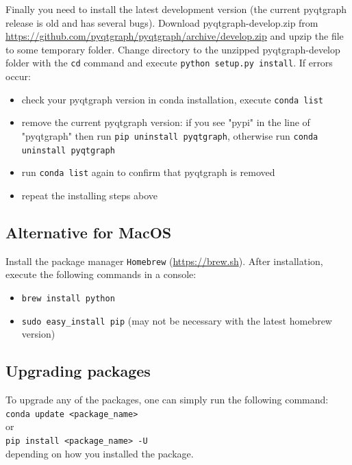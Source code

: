 \documentclass[oldfontcommands,openany,oneside]{memoir}
\begin{document}
Finally you need to install the latest development version (the current pyqtgraph release is old and has several bugs). Download pyqtgraph-develop.zip from \href{https://github.com/pyqtgraph/pyqtgraph/archive/develop.zip}{https://github.com/pyqtgraph/pyqtgraph/archive/develop.zip} and  upzip the file to some temporary folder. Change directory to the unzipped pyqtgraph-develop folder with the \texttt{cd} command and execute \texttt{python setup.py install}. If errors occur:
\begin{itemize}
\item check your pyqtgraph version in conda installation, execute \texttt{conda list}
\item remove the current pyqtgraph version: if you see "pypi" in the line of "pyqtgraph" then run \texttt{pip uninstall pyqtgraph}, otherwise run \texttt{conda uninstall pyqtgraph}
\item run \texttt{conda list} again to confirm that pyqtgraph is removed
\item repeat the installing steps above
\end{itemize}


\subsection{Alternative for MacOS}
Install the package manager \texttt{Homebrew} (\href{https://brew.sh}{https://brew.sh}). After installation, execute the following commands in a console:
\begin{itemize}
\item \texttt{brew install python}
\item \texttt{sudo easy\_install pip} (may not be necessary with the latest homebrew version)
\end{itemize}

\subsection{Upgrading packages}
To upgrade any of the packages, one can simply run the following command:
\verb+conda update <package_name>+\\
or\\
\verb+pip install <package_name> -U+\\
depending on how you installed the package.
\end{document}
